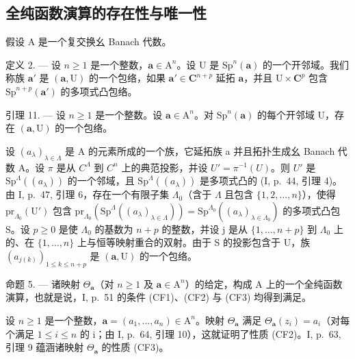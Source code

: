 \subsection{全纯函数演算的存在性与唯一性}

假设 A 是一个复交换幺 Banach 代数。

定义 2. --- 设 \(n \geqslant 1\) 是一个整数，\(\boldsymbol{a} \in \mathrm{A}^{n}\)。设 U 是 \(\mathrm{Sp}^{n}(\boldsymbol{a})\) 的一个开邻域。我们称族 \(\boldsymbol{a}'\) 是 \((\boldsymbol{a}, \mathrm{U})\) 的一个包络，如果 \(\boldsymbol{a}' \in \mathbf{C}^{n+p}\) 延拓 \(\boldsymbol{a}\)，并且 \(\mathrm{U} \times \mathbf{C}^{p}\) 包含 \(\mathrm{Sp}^{n+p}(\boldsymbol{a}')\) 的多项式凸包络。

引理 11. --- 设 \(n \geqslant 1\) 是一个整数。设 \(\boldsymbol{a} \in \mathrm{A}^{n}\)。对 \(\mathrm{Sp}^{n}(\boldsymbol{a})\) 的每个开邻域 U，存在 \((\boldsymbol{a}, \mathrm{U})\) 的一个包络。

设 \((a_{\lambda})_{\lambda\in\Lambda}\) 是 A 的元素所成的一个族，它延拓族 a 并且拓扑生成幺 Banach 代数 A。设 \(\pi\) 是从 \(C^{\Lambda}\) 到 \(C^{n}\) 上的典范投影，并设 \(U'=\pi^{-1}(U)\)。则 \(U'\) 是 \(\mathrm{Sp}^{\Lambda}((a_{\lambda}))\) 的一个邻域，且 \(\mathrm{Sp}^{\Lambda}((a_{\lambda}))\) 是多项式凸的 (I, p.~44, 引理 4)。由 I, p.~47, 引理 6，存在一个有限子集 \(\Lambda_{0}\)（含于 \(\Lambda\) 且包含 \(\{1,2,\ldots,n\}\)），使得 \(\mathrm{pr}_{\Lambda_{0}}(\mathrm{U}')\) 包含 \(\mathrm{pr}_{\Lambda_{0}}(\mathrm{Sp}^{\Lambda}((a_{\lambda})_{\lambda\in\Lambda}))=\mathrm{Sp}^{\Lambda_{0}}((a_{\lambda})_{\lambda\in\Lambda_{0}})\) 的多项式凸包 S。设 \(p\geqslant0\) 是使 \(\Lambda_{0}\) 的基数为 \(n+p\) 的整数，并设 j 是从 \(\{1,\ldots,n+p\}\) 到 \(\Lambda_{0}\) 上的、在 \(\{1,\ldots,n\}\) 上与恒等映射重合的双射。由于 S 的投影包含于 U，族 \((a_{j(k)})_{1\leqslant k\leqslant n+p}\) 是 \((\boldsymbol{a},\mathrm{U})\) 的一个包络。

命题 5. --- 诸映射 \(\Theta_{\boldsymbol{a}}\)（对 \(n \geqslant 1\) 及 \(\boldsymbol{a} \in \mathrm{A}^{n}\)）的给定，构成 A 上的一个全纯函数演算，也就是说，I, p.~51 的条件 (CF1)、(CF2) 与 (CF3) 均得到满足。

设 \(n \geqslant 1\) 是一个整数，\(\boldsymbol{a} = (a_{1}, \ldots, a_{n}) \in \mathrm{A}^{n}\)。映射 \(\Theta_{\boldsymbol{a}}\) 满足 \(\Theta_{\boldsymbol{a}}(z_{i}) = a_{i}\)（对每个满足 \(1 \leqslant i \leqslant n\) 的 i；由 I, p.~64, 引理 10），这就证明了性质 (CF2)。I, p.~63, 引理 9 蕴涵诸映射 \(\Theta_{\boldsymbol{a}}\) 的性质 (CF3)。

